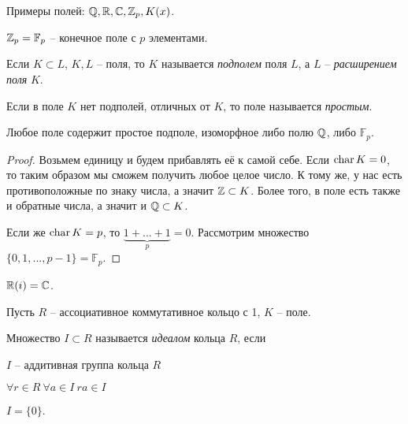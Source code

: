 \begin{Example}
	Примеры полей: $\mathbb{Q}, \mathbb{R}, \mathbb{C}, \mathbb{Z}_p, K(x)$. 
\end{Example}

\begin{notation}
	$\mathbb{Z}_p = \mathbb{F}_p$ -- конечное поле с $p$ элементами. 
\end{notation}

\begin{Def}
	Если $K \subset L$, $K, L$ -- поля, то $K$ называется \textit{подполем} поля $L$, а $L$ -- \textit{расширением поля} $K$.
\end{Def}

\begin{Def}
	Если в поле $K$ нет подполей, отличных от $K$, то поле называется \textit{простым}.
\end{Def}

\begin{Thm}
	Любое поле содержит простое подполе, изоморфное либо полю $\mathbb{Q}$, либо $\mathbb{F}_p$.
\end{Thm}

\begin{proof}
	Возьмем единицу и будем прибавлять её к самой себе. Если $\operatorname{char} K = 0$, то таким образом мы сможем получить любое целое число. К тому же, у нас есть противоположные по знаку числа, а значит $\mathbb{Z} \subset K$.
	Более того, в поле есть также и обратные числа, а значит и $\mathbb{Q} \subset K$.
	
	Если же $\operatorname{char} K = p$, то $\underbrace{1 + ... + 1}_p = 0$. Рассмотрим множество $\{0, 1, ..., p - 1\} = \mathbb{F}_p$. 
\end{proof}

\begin{Example}
	$\mathbb{R}(i) = \mathbb{C}$.
\end{Example}


Пусть $R$ -- ассоциативное коммутативное кольцо с 1, $K$ -- поле.

\begin{Def}[Идеал]
	Множество $I \subset R$ называется \textit{идеалом} кольца $R$, если 
	\begin{MyList}
		\item $I$ -- аддитивная группа кольца $R$
		\item $\forall r \in R \ \forall a \in I \ ra \in I$
	\end{MyList} 
\end{Def}

\begin{Example}
	$I = \{0\}$.
\end{Example}

